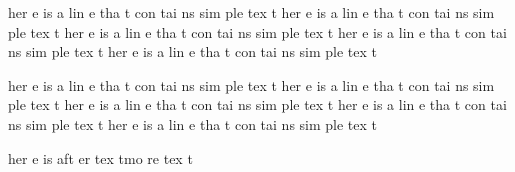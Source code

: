 her
e
is
a
lin
e
tha
t
con
tai
ns
sim
ple
tex
t
her
e
is
a
lin
e
tha
t
con
tai
ns
sim
ple
tex
t
her
e
is
a
lin
e
tha
t
con
tai
ns
sim
ple
tex
t
her
e
is
a
lin
e
tha
t
con
tai
ns
sim
ple
tex
t
her
e
is
a
lin
e
tha
t
con
tai
ns
sim
ple
tex
t %

her
e
is
a
lin
e
tha
t
con
tai
ns
sim
ple
tex
t
her
e
is
a
lin
e
tha
t
con
tai
ns
sim
ple
tex
t
her
e
is
a
lin
e
tha
t
con
tai
ns
sim
ple
tex
t
her
e
is
a
lin
e
tha
t
con
tai
ns
sim
ple
tex
t
her
e
is
a
lin
e
tha
t
con
tai
ns
sim
ple
tex
t%

her
e
is
aft
er
tex
tmo
re
tex
t%
